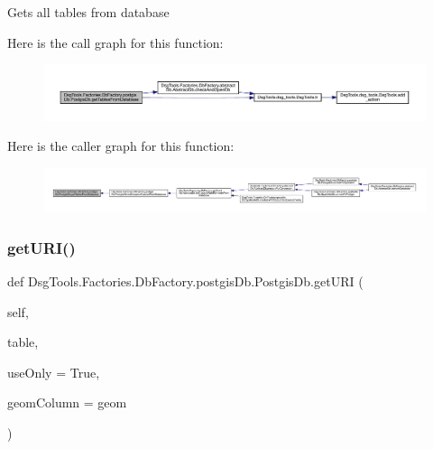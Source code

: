 \begin{DoxyVerb}Gets all tables from database
\end{DoxyVerb}
 Here is the call graph for this function\+:
\nopagebreak
\begin{figure}[H]
\begin{center}
\leavevmode
\includegraphics[width=350pt]{class_dsg_tools_1_1_factories_1_1_db_factory_1_1postgis_db_1_1_postgis_db_a39cf35c860d0470af3aba54955dd0c19_cgraph}
\end{center}
\end{figure}
Here is the caller graph for this function\+:
\nopagebreak
\begin{figure}[H]
\begin{center}
\leavevmode
\includegraphics[width=350pt]{class_dsg_tools_1_1_factories_1_1_db_factory_1_1postgis_db_1_1_postgis_db_a39cf35c860d0470af3aba54955dd0c19_icgraph}
\end{center}
\end{figure}
\mbox{\label{class_dsg_tools_1_1_factories_1_1_db_factory_1_1postgis_db_1_1_postgis_db_ac63b43fecaed6ce997f17389c520174c}} 
\subsubsection{\texorpdfstring{get\+U\+R\+I()}{getURI()}}
{\footnotesize\ttfamily def Dsg\+Tools.\+Factories.\+Db\+Factory.\+postgis\+Db.\+Postgis\+Db.\+get\+U\+RI (\begin{DoxyParamCaption}\item[{}]{self,  }\item[{}]{table,  }\item[{}]{use\+Only = {\ttfamily True},  }\item[{}]{geom\+Column = {\ttfamily \textquotesingle{}geom\textquotesingle{}} }\end{DoxyParamCaption})}

